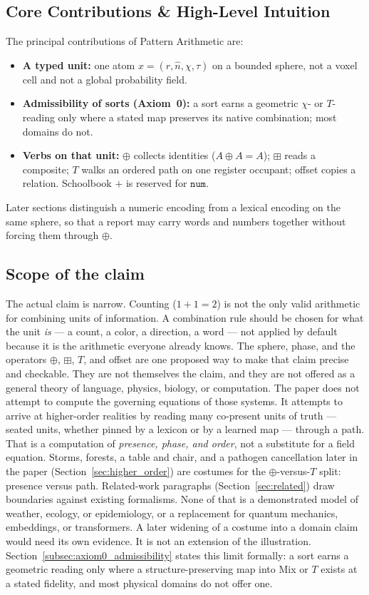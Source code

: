 \documentclass[12pt, a4paper]{article}
\begin{document}
\subsection{Core Contributions \& High-Level Intuition}
The principal contributions of Pattern Arithmetic are:
\begin{itemize}
    \item \textbf{A typed unit:} one atom $x=(r,\hat n,\chi,\tau)$ on a bounded sphere, not a voxel cell and not a global probability field.
    \item \textbf{Admissibility of sorts (Axiom~0):} a sort earns a geometric $\chi$- or $T$-reading only where a stated map preserves its native combination; most domains do not.
    \item \textbf{Verbs on that unit:} $\oplus$ collects identities ($A\oplus A=A$); $\boxplus$ reads a composite; $T$ walks an ordered path on one register occupant; offset copies a relation. Schoolbook $+$ is reserved for $\mathtt{num}$.
\end{itemize}

Later sections distinguish a numeric encoding from a lexical encoding on the same sphere, so that a report may carry words and numbers together without forcing them through $\oplus$.

\subsection{Scope of the claim}
\label{subsec:claim_scope}
The actual claim is narrow. Counting ($1+1=2$) is not the only valid
arithmetic for combining units of information. A combination rule
should be chosen for what the unit \emph{is} --- a count, a color, a
direction, a word --- not applied by default because it is the
arithmetic everyone already knows. The sphere, phase, and the
operators $\oplus$, $\boxplus$, $T$, and offset are one proposed way
to make that claim precise and checkable. They are not themselves the
claim, and they are not offered as a general theory of language,
physics, biology, or computation.
The paper does not attempt to compute the governing equations of
those systems. It attempts to arrive at higher-order realities by
reading many co-present units of truth --- seated units, whether
pinned by a lexicon or by a learned map --- through a path. That is a
computation of \emph{presence, phase, and order}, not a substitute for
a field equation.
Storms, forests, a table and chair, and a pathogen cancellation later in the paper
(Section~\ref{sec:higher_order}) are costumes for the
$\oplus$-versus-$T$ split: presence versus path. Related-work
paragraphs (Section~\ref{sec:related}) draw boundaries against
existing formalisms. None of that is a demonstrated model of weather,
ecology, or epidemiology, or a replacement for quantum mechanics,
embeddings, or transformers. A later widening of a costume into a
domain claim would need its own evidence. It is not an extension of
the illustration.
Section~\ref{subsec:axiom0_admissibility} states this limit formally:
a sort earns a geometric reading only where a structure-preserving
map into Mix or $T$ exists at a stated fidelity, and most physical
domains do not offer one.
\end{document}

